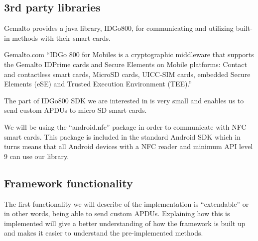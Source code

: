 \subsection{3rd party libraries}
\label{sec:gemaltoApp}
Gemalto provides a java library, IDGo800, for communicating and utilizing built-in methods with their smart cards.

\begin{aquote}{Gemalto.com \cite{GemaltoIDGo800}}
``IDGo 800 for Mobiles is a cryptographic middleware that supports the Gemalto IDPrime cards and Secure Elements on Mobile platforms: Contact and contactless smart cards, MicroSD cards, UICC-SIM cards, embedded Secure Elements (eSE) and Trusted Execution Environment (TEE).''
\end{aquote}

The part of IDGo800 SDK we are interested in is very small and enables us to send custom APDUs to micro SD smart cards.

We will be using the ``android.nfc'' package in order to communicate with NFC smart cards. This package is included in the standard Android SDK which in turns means that all Android devices with a NFC reader and minimum API level 9 \cite{androidNFCminSDK} can use our library.

\subsection{Framework functionality}
\label{sec:func}
The first functionality we will describe of the implementation is ``extendable'' or in other words, being able to send custom APDUs. Explaining how this is implemented will give a better understanding of how the framework is built up and makes it easier to understand the pre-implemented methods.

